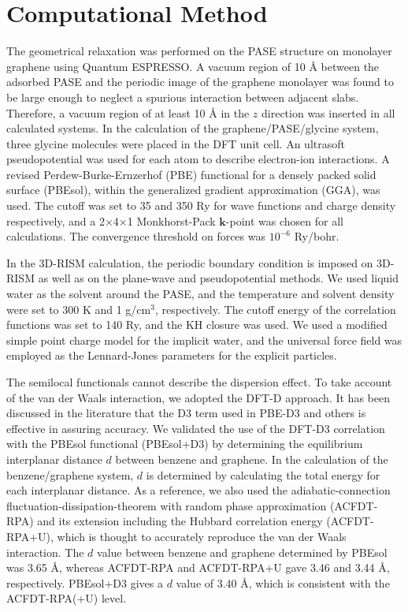 \documentclass[journal=acsodf,manuscript=article]{achemso}
\begin{document}
\section{Computational Method}

The geometrical relaxation was performed on the PASE structure on monolayer graphene using Quantum ESPRESSO\cite{giannozzi2009quantum,giannozzi2017advanced,giannozzi2020quantum}. 
A vacuum region of 10 {\AA} between the adsorbed PASE and the periodic image of the graphene monolayer was found to be large enough to neglect a spurious interaction between adjacent slabs. Therefore, a vacuum region of at least 10 {\AA} in the $z$ direction was inserted in all calculated systems. In the calculation of the graphene/PASE/glycine system, three glycine molecules were placed in the DFT unit cell. An ultrasoft pseudopotential\cite{vanderbilt1990soft} was used for each atom to describe electron-ion interactions. A revised Perdew-Burke-Ernzerhof (PBE) functional for a densely packed solid surface (PBEsol)\cite{perdew2008restoring}, within the generalized gradient approximation (GGA), was used. The cutoff was set to 35 and 350 Ry for wave functions and charge density respectively, and a 2×4×1 Monkhorst-Pack\cite{monkhorst1976special} $\boldsymbol{k}$-point was chosen for all calculations. The convergence threshold on forces was $10^{-6}$ Ry/bohr.

In the 3D-RISM calculation, the periodic boundary condition is imposed on 3D-RISM as well as on the plane-wave and pseudopotential methods\cite{nishihara2017hybrid}. We used liquid water as the solvent around the PASE, and the temperature and solvent density were set to 300 K and 1 g/cm$^3$, respectively. The cutoff energy of the correlation functions was set to 140 Ry, and the KH closure was used. We used a modified simple point charge model\cite{Berendsen1981} for the implicit water, and the universal force field\cite{rappe1992uff} was employed as the Lennard-Jones parameters for the explicit particles.

The semilocal functionals cannot describe the dispersion effect. To take account of the van der Waals interaction, we adopted the DFT-D approach\cite{grimme2006semiempirical,grimme2010consistent,grimme2011effect}.
It has been discussed in the literature\cite{LEBEDEVA201745,PhysRevB.98.174103} that the D3 term used in PBE-D3 and others is effective in assuring accuracy. We validated the use of the DFT-D3 correlation with the PBEsol functional (PBEsol+D3) by determining the equilibrium interplanar distance $d$ between benzene and graphene. In the calculation of the benzene/graphene system, $d$ is determined by calculating the total energy for each interplanar distance. As a reference, we also used the adiabatic-connection fluctuation-dissipation-theorem with random phase approximation (ACFDT-RPA)\cite{PhysRevLett.105.196401} and its extension including the Hubbard correlation energy (ACFDT-RPA+U)\cite{kusakabe2020interplanar}, which is thought to accurately reproduce the van der Waals interaction. The $d$ value between benzene and graphene determined by PBEsol was 3.65 {\AA}, whereas ACFDT-RPA and ACFDT-RPA+U gave 3.46 and 3.44 {\AA}, respectively. PBEsol+D3 gives a $d$ value of 3.40 {\AA}, which is consistent with the ACFDT-RPA(+U) level.
\end{document}
